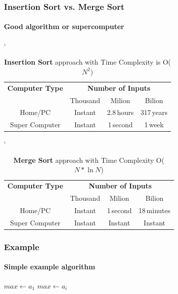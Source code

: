 \documentclass{beamer}
\begin{document}
\begin{frame}
  \frametitle{Insertion Sort vs. Merge Sort}
  \framesubtitle{Good algorithm or supercomputer}
   \begin{table}[h]
    \begin{center}
    \catcode`
    \begin{tabular}{| c | c | c | c |} \hline
      \textbf{Computer Type} & \multicolumn{3}{|c|}{\textbf{Number of Inputs}} \\ \cline{1-4}
       & Thousand & Milion & Bilion \\ \cline{1-4}
      Home/PC & Instant & 2.8\,hours & 317\,years \\ \cline{1-4}
      Super Computer & Instant & 1\,second & 1\,week \\ \cline{1-4} \hline
      \end{tabular}
      \caption{\textbf{Insertion Sort} approach with Time Complexity is O($N^{2}$)}
     \end{center}
   \end{table}
   \begin{table}[h]
    \begin{center}
    \catcode`
    \begin{tabular}{| c | c | c | c |} \hline
      \textbf{Computer Type} & \multicolumn{3}{|c|}{\textbf{Number of Inputs}} \\ \cline{1-4}
       & Thousand & Milion & Bilion \\ \cline{1-4}
      Home/PC & Instant & 1\,second & 18\,minutes \\ \cline{1-4}
      Super Computer & Instant & Instant & Instant \\ \cline{1-4} \hline
      \end{tabular}
      \caption{\textbf{Merge Sort} approach with Time Complexity O($N*\ln{N}$)}
     \end{center}
   \end{table} \nocite{statistics}
\end{frame}



\begin{frame}
  \frametitle{Example}
  \framesubtitle{Simple example algorithm}
  \begin{algorithm}[H]
    \SetNlSty{}{}{:}
    \SetInd{1em}{1em}
    \SetNlSkip{-1.2em}
    \Indp \Indp 
    \BlankLine
    $max \gets a_1$\;
     {
     {
      $max \gets a_i$\;
      }
    }
    \;
  \end{algorithm} \nocite{example}
\end{frame}
\end{document}
